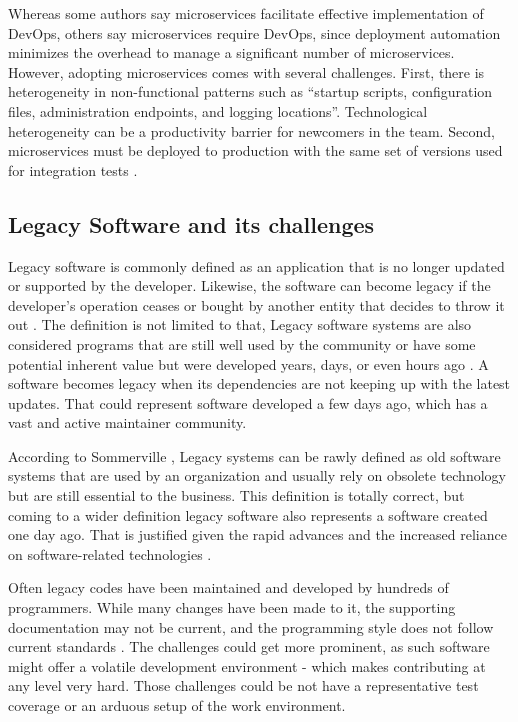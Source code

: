 Whereas some authors say microservices facilitate effective implementation of
DevOps, others say microservices require DevOps, since deployment automation
minimizes the overhead to manage a significant number of microservices. However,
adopting microservices comes with several challenges. First, there is
heterogeneity in non-functional patterns such as “startup scripts, configuration
files, administration endpoints, and logging locations”. Technological
heterogeneity can be a productivity barrier for newcomers in the team. Second,
microservices must be deployed to production with the same set of versions used
for integration tests \cite{rocha2019}.

\subsection{Legacy Software and its challenges}

Legacy software is commonly defined as an application that is no longer updated
or supported by the developer. Likewise, the software can become legacy if the
developer's operation ceases or bought by another entity that decides to throw
it out \cite{chima2016}. The definition is not limited to that, Legacy software
systems are also considered programs that are still well used by the community
or have some potential inherent value but were developed years, days, or even
hours ago \cite{worth2003}. A software becomes legacy when its dependencies are
not keeping up with the latest updates. That could represent software developed
a few days ago, which has a vast and active maintainer community. 

According to Sommerville \cite{sommerville2015}, Legacy systems can be rawly
defined as old software systems that are used by an organization and usually
rely on obsolete technology but are still essential to the business. This
definition is totally correct, but coming to a wider definition legacy software
also represents a software created one day ago. That is justified given the
rapid advances and the increased reliance on software-related technologies
\cite{cascio2016}. 

Often legacy codes have been maintained and developed by hundreds of
programmers. While many changes have been made to it, the supporting
documentation may not be current, and the programming style does not follow
current standards \cite{worth2003}. The challenges could get more prominent, as
such software might offer a volatile development environment - which makes
contributing at any level very hard. Those challenges could be not have a
representative test coverage or an arduous setup of the work environment.

